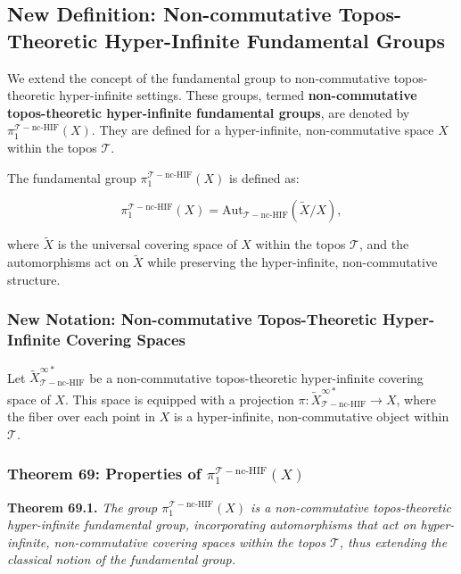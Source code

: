 \documentclass{article}
\begin{document}
\subsection{New Definition: Non-commutative Topos-Theoretic Hyper-Infinite Fundamental Groups}
We extend the concept of the fundamental group to non-commutative topos-theoretic hyper-infinite settings. These groups, termed \textbf{non-commutative topos-theoretic hyper-infinite fundamental groups}, are denoted by \(\pi_1^{\mathcal{T}-\text{nc-HIF}}(X)\). They are defined for a hyper-infinite, non-commutative space \(X\) within the topos \(\mathcal{T}\).

The fundamental group \(\pi_1^{\mathcal{T}-\text{nc-HIF}}(X)\) is defined as:

\[
\pi_1^{\mathcal{T}-\text{nc-HIF}}(X) = \text{Aut}_{\mathcal{T}-\text{nc-HIF}}(\widetilde{X}/X),
\]

where \(\widetilde{X}\) is the universal covering space of \(X\) within the topos \(\mathcal{T}\), and the automorphisms act on \(\widetilde{X}\) while preserving the hyper-infinite, non-commutative structure.

\subsubsection{New Notation: Non-commutative Topos-Theoretic Hyper-Infinite Covering Spaces}
Let \(\widetilde{X}_{\mathcal{T}-\text{nc-HIF}}^{\infty *}\) be a non-commutative topos-theoretic hyper-infinite covering space of \(X\). This space is equipped with a projection \(\pi: \widetilde{X}_{\mathcal{T}-\text{nc-HIF}}^{\infty *} \to X\), where the fiber over each point in \(X\) is a hyper-infinite, non-commutative object within \(\mathcal{T}\).

\subsubsection{Theorem 69: Properties of \(\pi_1^{\mathcal{T}-\text{nc-HIF}}(X)\)}
\textbf{Theorem 69.1.} \textit{The group \(\pi_1^{\mathcal{T}-\text{nc-HIF}}(X)\) is a non-commutative topos-theoretic hyper-infinite fundamental group, incorporating automorphisms that act on hyper-infinite, non-commutative covering spaces within the topos \(\mathcal{T}\), thus extending the classical notion of the fundamental group.}
\end{document}

